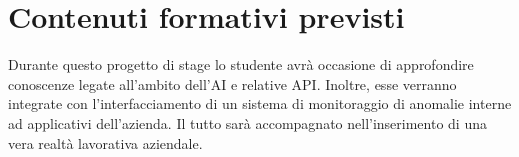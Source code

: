 \section*{Contenuti formativi previsti}
Durante questo progetto di stage lo studente avrà occasione di approfondire conoscenze legate all'ambito dell'AI e relative API.
Inoltre, esse verranno integrate con l'interfacciamento di un sistema di monitoraggio di anomalie interne ad applicativi dell'azienda.
Il tutto sarà accompagnato nell'inserimento di una vera realtà lavorativa aziendale.

\newpage
